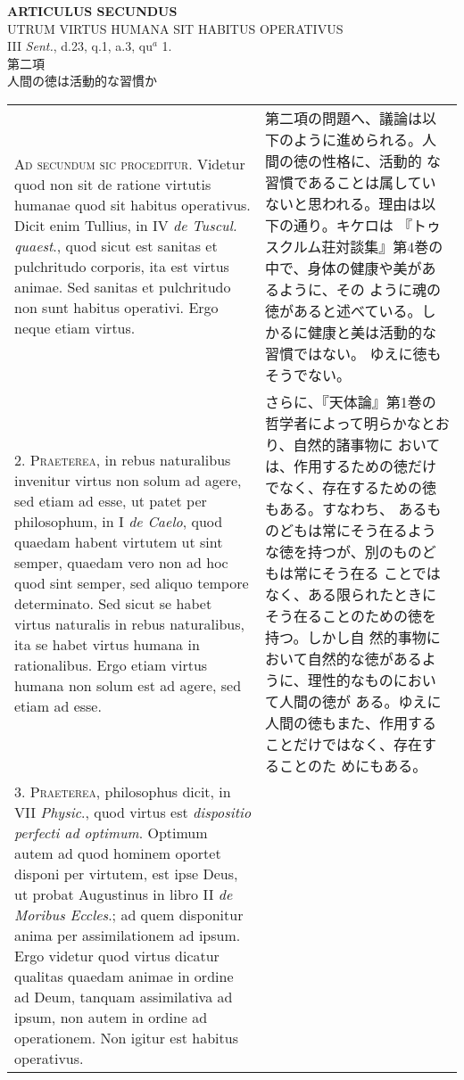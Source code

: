 \documentclass[10pt]{jsarticle}
\begin{document}
\begin{center}
{\Large {\bf ARTICULUS SECUNDUS}}\\
{\large UTRUM VIRTUS HUMANA SIT HABITUS OPERATIVUS}\\
{\footnotesize III {\itshape Sent.}, d.23, q.1, a.3, qu$^{a}$ 1.}\\
{\Large 第二項\\人間の徳は活動的な習慣か}
\end{center}

\begin{longtable}{p{21em}p{21em}}

{\scshape Ad secundum sic proceditur}. Videtur quod non sit de ratione
virtutis humanae quod sit habitus operativus. Dicit enim Tullius, in
IV {\itshape de Tuscul. quaest}., quod sicut est sanitas et
pulchritudo corporis, ita est virtus animae. Sed sanitas et
pulchritudo non sunt habitus operativi. Ergo neque etiam virtus.

&

第二項の問題へ、議論は以下のように進められる。人間の徳の性格に、活動的
な習慣であることは属していないと思われる。理由は以下の通り。キケロは
『トゥスクルム荘対談集』第4巻の中で、身体の健康や美があるように、その
ように魂の徳があると述べている。しかるに健康と美は活動的な習慣ではない。
ゆえに徳もそうでない。

\\

2. {\scshape Praeterea}, in rebus naturalibus invenitur virtus non
solum ad agere, sed etiam ad esse, ut patet per philosophum, in I
{\itshape de Caelo}, quod quaedam habent virtutem ut sint semper,
quaedam vero non ad hoc quod sint semper, sed aliquo tempore
determinato. Sed sicut se habet virtus naturalis in rebus naturalibus,
ita se habet virtus humana in rationalibus. Ergo etiam virtus humana
non solum est ad agere, sed etiam ad esse.

&

さらに、『天体論』第1巻の哲学者によって明らかなとおり、自然的諸事物に
おいては、作用するための徳だけでなく、存在するための徳もある。すなわち、
あるものどもは常にそう在るような徳を持つが、別のものどもは常にそう在る
ことではなく、ある限られたときにそう在ることのための徳を持つ。しかし自
然的事物において自然的な徳があるように、理性的なものにおいて人間の徳が
ある。ゆえに人間の徳もまた、作用することだけではなく、存在することのた
めにもある。

\\

3. {\scshape Praeterea}, philosophus dicit, in VII {\itshape Physic}.,
quod virtus est {\itshape dispositio perfecti ad optimum}. Optimum
autem ad quod hominem oportet disponi per virtutem, est ipse Deus, ut
probat Augustinus in libro II {\itshape de Moribus Eccles}.; ad quem
disponitur anima per assimilationem ad ipsum. Ergo videtur quod virtus
dicatur qualitas quaedam animae in ordine ad Deum, tanquam
assimilativa ad ipsum, non autem in ordine ad operationem. Non igitur
est habitus operativus.


\end{longtable}
\end{document}
